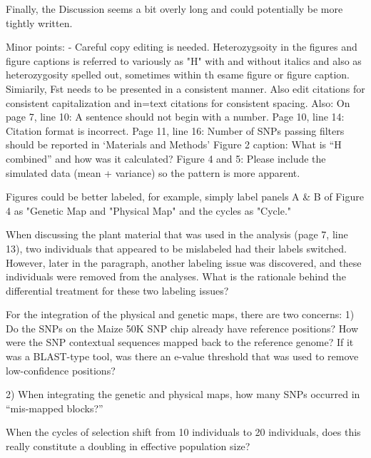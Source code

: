 \documentclass[onecolumn,oneside,letterpaper]{article}
\begin{document}

Finally, the Discussion seems a bit overly long and could potentially be more tightly written.


Minor points: 
- Careful copy editing is needed. Heterozygsoity in the figures and figure captions is referred to variously 
as "H" with and without italics and also as heterozygosity spelled out, sometimes within th esame figure or 
figure caption. Simiarily, Fst needs to be presented in a consistent manner. Also edit citations for 
consistent capitalization and in=text citations for consistent spacing. Also:
On page 7, line 10: A sentence should not begin with a number.
Page 10, line 14: Citation format is incorrect. 
Page 11, line 16: Number of SNPs passing filters should be reported in ‘Materials and Methods’
Figure 2 caption: What is “H combined” and how was it calculated?
Figure 4 and 5: Please include the simulated data (mean + variance) so the pattern is more apparent.


Figures could be better labeled, for example, simply label panels A \& B of Figure 4  as "Genetic Map and 
"Physical Map" and the cycles as "Cycle."

When discussing the plant material that was used in the analysis (page 7, line 13), two individuals that 
appeared to be mislabeled had their labels switched. However, later in the paragraph, another labeling 
issue was discovered, and these individuals were removed from the analyses. What is the rationale behind 
the differential treatment for these two labeling issues?


For the integration of the physical and genetic maps, there are two concerns:
1) Do the SNPs on the Maize 50K SNP chip already have reference positions? How were the SNP contextual 
sequences mapped back to the reference genome? If it was a BLAST-type tool, was there an e-value 
threshold that was used to remove low-confidence positions? 


2) When integrating the genetic and physical maps, how many SNPs occurred in “mis-mapped blocks?” 


When the cycles of selection shift from 10 individuals to 20 individuals, does this really constitute a 
doubling in effective population size?
\end{document}
